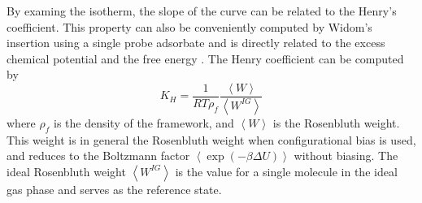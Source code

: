 By examing the isotherm, the slope of the curve can be related to the Henry's coefficient. This property can also be conveniently computed
by Widom's insertion using a single probe adsorbate and is directly related to the excess chemical
potential and the free energy \cite{FrenkelSmit2002}. The Henry coefficient can be computed by
\begin{equation}
  K_H = \frac{1}{R T \rho_f}\frac{\left\langle W \right\rangle}{\left\langle W^{IG}\right\rangle}
\end{equation}
where $\rho_f$ is the density of the framework, and $\left\langle W \right\rangle$ is the Rosenbluth weight. This weight is in general
the Rosenbluth weight when configurational bias is used, and reduces to the Boltzmann factor $\left\langle \exp\left(-\beta\Delta U\right) \right\rangle$
without biasing. The ideal Rosenbluth weight $\left\langle W^{IG}\right\rangle$ is the value for a single molecule in the ideal gas phase and serves
as the reference state.
\begin{center}
\end{center}

